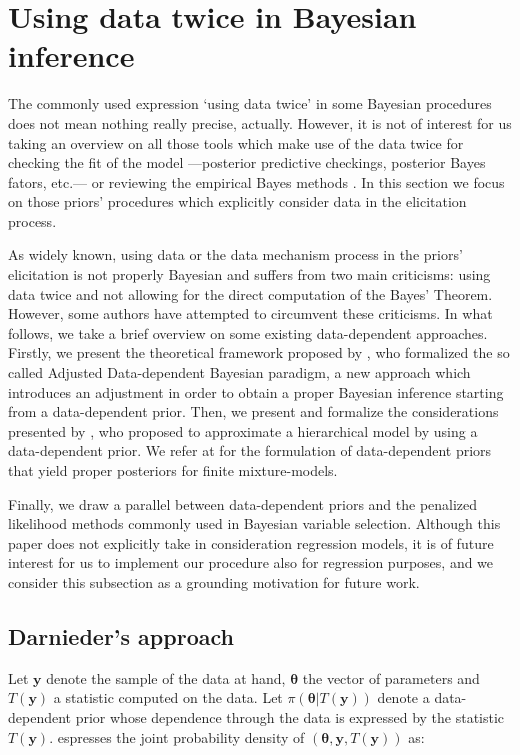 \documentclass{statsoc}
\begin{document}
\section{Using data twice in Bayesian inference}
\label{sec:datadep}

The commonly used expression `using data twice' in some Bayesian procedures does not mean nothing really precise, actually. However, it is not of interest for us taking an overview on all those tools which make use of the data twice for checking the fit of the model ---posterior predictive checkings, posterior Bayes fators, etc.--- or reviewing the empirical Bayes methods \citep{carlin2000bayes}. In this section we focus on those priors' procedures which explicitly consider data in the elicitation process. 

As widely known, using data or the data mechanism process in the priors' elicitation is not properly Bayesian and suffers from two main criticisms: using data twice and not allowing for the direct computation of the Bayes' Theorem. However, some authors have attempted to circumvent these criticisms. In what follows, we take a brief overview on some existing data-dependent approaches. Firstly, we present the theoretical framework proposed by \cite{darnieder2011bayesian}, who formalized the so called Adjusted Data-dependent Bayesian paradigm, a new approach which introduces an adjustment in order to obtain a proper Bayesian inference starting from a data-dependent prior. Then, we present and formalize the considerations presented by \cite{gelmandatadependent}, who proposed to approximate a hierarchical model by using a data-dependent prior. We refer at \cite{wasserman2000asymptotic} for the formulation of data-dependent priors that yield proper posteriors for finite mixture-models.

 Finally, we draw a parallel between data-dependent priors and the penalized likelihood methods commonly used in Bayesian variable selection. Although this paper does not explicitly take in consideration regression models, it is of future interest for us to implement our procedure also for regression purposes, and we consider this subsection as a grounding motivation for future work.

\subsection{Darnieder's approach}
\label{sec:darnieder}

Let $\bm{y}$ denote the sample of the data at hand, $\bm{\theta}$ the vector of parameters and $T( \bm{y})$ a statistic computed on the data. Let $\pi(\bm{\theta}| T( \bm{y}))$ denote a data-dependent prior whose dependence through the data is expressed by the statistic $T( \bm{y})$.  \cite{darnieder2011bayesian} espresses the joint probability density of $(\bm{\theta}, \bm{y}, T( \bm{y}))$ as:
\end{document}
